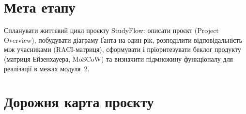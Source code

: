 \documentclass[12pt]{article}
\begin{document}

\section{Мета етапу}
Спланувати життєвий цикл проєкту StudyFlow: описати проєкт (Project Overview), побудувати діаграму Ґанта на один рік, розподілити відповідальність між учасниками (RACI-матриця), сформувати і пріоритезувати беклог продукту (матриця Ейзенхауера, MoSCoW) та визначити підмножину функціоналу для реалізації в межах модуля~2.

\section{Дорожня карта проєкту}
\end{document}
